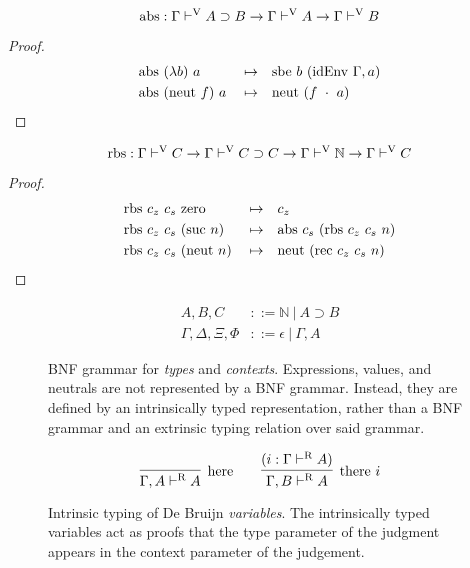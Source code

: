 \documentclass{llncs}
\def\dfn{\mapsto}
\def\arr{\supset}
\def\marr{\rightarrow}
\def\app{\cdot}
\def\lam{\lambda}
\def\nat{\mathbb{N}}
\def\emp{\epsilon}
\def\zero{\con{zero}}
\def\suc{\con{suc}}
\def\neut{\con{neut}}
\def\rec{\fun{rec}}
\def\rbs{\fun{rbs}}
\def\abs{\fun{abs}}
\def\sbe{\fun{sbe}}
\def\idenv{\fun{idEnv}}
\newcommand{\turn}[1]{\vdash^\con{#1}}
\newcommand{\con}[1]{\textmd{#1}}
\newcommand{\fun}[1]{\textmd{#1}}
\newcommand{\typv}[1]{\Gamma \turn{V} #1}
\newcommand{\typr}[1]{\Gamma \turn{R} #1}
\newcommand{\ctypr}[2]{\Gamma , #1 \turn{R} #2}
\begin{document}
\begin{lemma}
\label{thm:mod:abs}
$$
\abs : \typv{A \arr B} \marr \typv{A} \marr \typv{B}
$$

\begin{proof}
\begin{align*}
&\abs ~ (\lam b) ~ a &&\dfn&& \sbe~b~(\idenv~\Gamma, a)\\
&\abs ~ (\neut~f) ~ a &&\dfn&& \neut~(f~\app~a)
\end{align*}
\end{proof}

\end{lemma}


\begin{lemma}
\label{thm:mod:rbs}
$$
\rbs : \typv{C} \marr \typv{C \arr C} \marr \typv{\nat} \marr \typv{C}
$$

\begin{proof}
\begin{align*}
&\rbs ~ c_z ~ c_s ~ \zero &&\dfn&& c_z\\
&\rbs ~ c_z ~ c_s ~ (\suc~n) &&\dfn&& \abs~c_s~(\rbs~c_z~c_s~n)\\
&\rbs ~ c_z ~ c_s ~ (\neut~n) &&\dfn&& \neut~(\rec~c_z~c_s~n)
\end{align*}
\end{proof}

\end{lemma}


\clearpage

\begin{figure}
\caption{
BNF grammar for \textit{types} and \textit{contexts}. 
Expressions, values, and neutrals
are not represented by a BNF grammar. Instead, they are defined by
an intrinsically typed representation, rather than a BNF grammar and
an extrinsic typing relation over said grammar.
}
\begin{align*}
A, B, C &::= \nat ~ | ~ A \arr B \\
\Gamma, \Delta, \Xi, \Phi &::= \emp ~ | ~ \Gamma , A
\end{align*}
\label{fig:gram}
\end{figure}

\begin{figure}
\caption{
Intrinsic typing of De Bruijn \textit{variables}.
The intrinsically typed variables act as proofs that the type
parameter of the judgment appears in the context parameter of the
judgement.
}
$$
\infer
  [\con{here}]
  {\ctypr{A}{A}}
{
}
\qquad
\infer
  [\con{there} ~ i]
  {\ctypr{B}{A}}
{
  (i : \typr{A})
}
$$
\label{fig:typr}
\end{figure}
\end{document}
